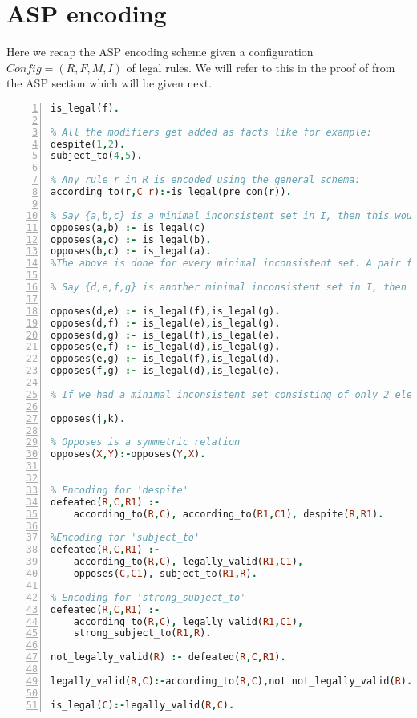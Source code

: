 \section{ASP encoding}
Here we recap the ASP encoding scheme given a configuration $Config =
(R,F,M,I)$ of legal rules. We will refer to this in the proof of  from the ASP section which will be given next. 
\begin{lstlisting}[language=Prolog, numbers=left]
% For any f in F, we have:
is_legal(f). 

% All the modifiers get added as facts like for example:
despite(1,2).
subject_to(4,5).

% Any rule r in R is encoded using the general schema:
according_to(r,C_r):-is_legal(pre_con(r)).

% Say {a,b,c} is a minimal inconsistent set in I, then this would get encoded as: 
opposes(a,b) :- is_legal(c)
opposes(a,c) :- is_legal(b).
opposes(b,c) :- is_legal(a).
%The above is done for every minimal inconsistent set. A pair from the set forms the opposes predicate and the rest of the elements go in the body 

% Say {d,e,f,g} is another minimal inconsistent set in I, then this would get encoded as:

opposes(d,e) :- is_legal(f),is_legal(g).
opposes(d,f) :- is_legal(e),is_legal(g).
opposes(d,g) :- is_legal(f),is_legal(e).
opposes(e,f) :- is_legal(d),is_legal(g).
opposes(e,g) :- is_legal(f),is_legal(d).
opposes(f,g) :- is_legal(d),is_legal(e).

% If we had a minimal inconsistent set consisting of only 2 elements say {j,k}, this would get encoded as:

opposes(j,k).

% Opposes is a symmetric relation
opposes(X,Y):-opposes(Y,X).


% Encoding for 'despite'
defeated(R,C,R1) :-
    according_to(R,C), according_to(R1,C1), despite(R,R1).

%Encoding for 'subject_to'
defeated(R,C,R1) :-
    according_to(R,C), legally_valid(R1,C1),
    opposes(C,C1), subject_to(R1,R).

% Encoding for 'strong_subject_to'
defeated(R,C,R1) :-
    according_to(R,C), legally_valid(R1,C1),
    strong_subject_to(R1,R).

not_legally_valid(R) :- defeated(R,C,R1).

legally_valid(R,C):-according_to(R,C),not not_legally_valid(R).

is_legal(C):-legally_valid(R,C).
\end{lstlisting}




